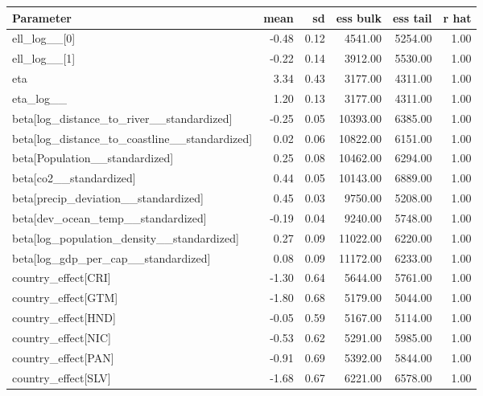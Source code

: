 \begin{table}[H]
\centering
{}
\label{tab:full_model_params_ca}
\footnotesize
\begin{tabular}{lrrrrr}
\toprule
\textbf{Parameter} & \textbf{mean} & \textbf{sd} & \textbf{ess bulk} & \textbf{ess tail} & \textbf{r hat} \\
\midrule
ell\_log\_\_[0] & -0.48 & 0.12 & 4541.00 & 5254.00 & 1.00 \\
ell\_log\_\_[1] & -0.22 & 0.14 & 3912.00 & 5530.00 & 1.00 \\
eta & 3.34 & 0.43 & 3177.00 & 4311.00 & 1.00 \\
eta\_log\_\_ & 1.20 & 0.13 & 3177.00 & 4311.00 & 1.00 \\
beta[log\_distance\_to\_river\_\_standardized] & -0.25 & 0.05 & 10393.00 & 6385.00 & 1.00 \\
beta[log\_distance\_to\_coastline\_\_standardized] & 0.02 & 0.06 & 10822.00 & 6151.00 & 1.00 \\
beta[Population\_\_standardized] & 0.25 & 0.08 & 10462.00 & 6294.00 & 1.00 \\
beta[co2\_\_standardized] & 0.44 & 0.05 & 10143.00 & 6889.00 & 1.00 \\
beta[precip\_deviation\_\_standardized] & 0.45 & 0.03 & 9750.00 & 5208.00 & 1.00 \\
beta[dev\_ocean\_temp\_\_standardized] & -0.19 & 0.04 & 9240.00 & 5748.00 & 1.00 \\
beta[log\_population\_density\_\_standardized] & 0.27 & 0.09 & 11022.00 & 6220.00 & 1.00 \\
beta[log\_gdp\_per\_cap\_\_standardized] & 0.08 & 0.09 & 11172.00 & 6233.00 & 1.00 \\
country\_effect[CRI] & -1.30 & 0.64 & 5644.00 & 5761.00 & 1.00 \\
country\_effect[GTM] & -1.80 & 0.68 & 5179.00 & 5044.00 & 1.00 \\
country\_effect[HND] & -0.05 & 0.59 & 5167.00 & 5114.00 & 1.00 \\
country\_effect[NIC] & -0.53 & 0.62 & 5291.00 & 5985.00 & 1.00 \\
country\_effect[PAN] & -0.91 & 0.69 & 5392.00 & 5844.00 & 1.00 \\
country\_effect[SLV] & -1.68 & 0.67 & 6221.00 & 6578.00 & 1.00 \\
\bottomrule
\end{tabular}
\end{table}
